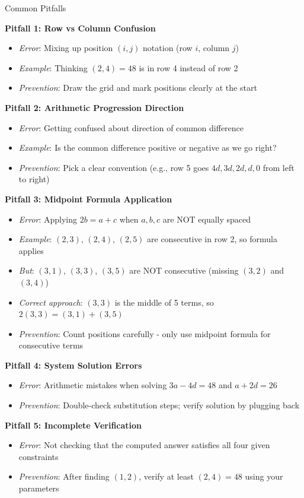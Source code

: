 \documentclass[12pt]{article}
\begin{document}
\begin{warningbox}{Common Pitfalls}

\textbf{Pitfall 1: Row vs Column Confusion}
\begin{itemize}
    \item \textit{Error}: Mixing up position $(i,j)$ notation (row $i$, column $j$)
    \item \textit{Example}: Thinking $(2,4) = 48$ is in row 4 instead of row 2
    \item \textit{Prevention}: Draw the grid and mark positions clearly at the start
\end{itemize}

\textbf{Pitfall 2: Arithmetic Progression Direction}
\begin{itemize}
    \item \textit{Error}: Getting confused about direction of common difference
    \item \textit{Example}: Is the common difference positive or negative as we go right?
    \item \textit{Prevention}: Pick a clear convention (e.g., row 5 goes $4d, 3d, 2d, d, 0$ from left to right)
\end{itemize}

\textbf{Pitfall 3: Midpoint Formula Application}
\begin{itemize}
    \item \textit{Error}: Applying $2b = a + c$ when $a, b, c$ are NOT equally spaced
    \item \textit{Example}: $(2,3)$, $(2,4)$, $(2,5)$ are consecutive in row 2, so formula applies
    \item \textit{But}: $(3,1)$, $(3,3)$, $(3,5)$ are NOT consecutive (missing $(3,2)$ and $(3,4)$)
    \item \textit{Correct approach}: $(3,3)$ is the middle of 5 terms, so $2(3,3) = (3,1) + (3,5)$
    \item \textit{Prevention}: Count positions carefully - only use midpoint formula for consecutive terms
\end{itemize}

\textbf{Pitfall 4: System Solution Errors}
\begin{itemize}
    \item \textit{Error}: Arithmetic mistakes when solving $3a - 4d = 48$ and $a + 2d = 26$
    \item \textit{Prevention}: Double-check substitution steps; verify solution by plugging back
\end{itemize}

\textbf{Pitfall 5: Incomplete Verification}
\begin{itemize}
    \item \textit{Error}: Not checking that the computed answer satisfies all four given constraints
    \item \textit{Prevention}: After finding $(1,2)$, verify at least $(2,4) = 48$ using your parameters
\end{itemize}

\end{warningbox}
\end{document}
